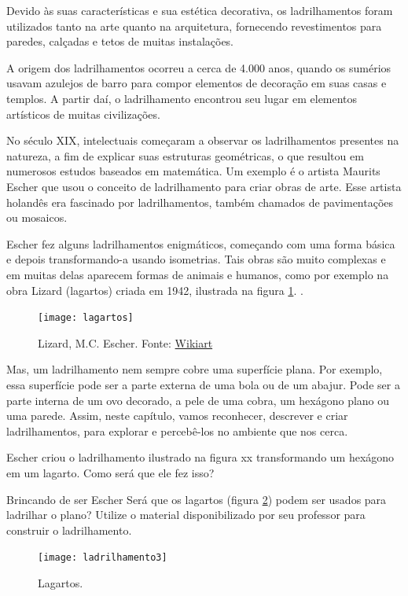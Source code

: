 \clearpage


\label{ladri-exp-1}

Devido às suas características e sua estética decorativa, os ladrilhamentos foram utilizados tanto na arte quanto na arquitetura, fornecendo revestimentos para paredes, calçadas e tetos de muitas instalações. 

A origem dos ladrilhamentos ocorreu a cerca de  4.000 anos, quando os sumérios usavam azulejos de barro para compor elementos de decoração em suas casas e templos. A partir daí, o ladrilhamento encontrou seu lugar em elementos artísticos de muitas civilizações. 

No século XIX, intelectuais começaram a observar os ladrilhamentos presentes na natureza, a fim de explicar suas estruturas geométricas, o que resultou em numerosos estudos baseados em matemática. Um exemplo é  o artista Maurits Escher que usou o conceito de ladrilhamento para criar obras de arte. Esse artista holandês era fascinado por ladrilhamentos, também chamados de pavimentações ou mosaicos. 

Escher fez alguns ladrilhamentos enigmáticos, começando com uma forma básica e depois transformando-a usando isometrias.  Tais obras são muito complexas e em muitas delas aparecem formas de  animais e humanos, como por exemplo na obra  Lizard (lagartos) criada em 1942, ilustrada na figura \ref{lad-fig-1}.
. 

\begin{figure}[H]
\centering
\texttt{[image: lagartos]}

\caption{Lizard, M.C. Escher. Fonte: \href{https://www.wikiart.org/en/m-c-escher/lizard-1}{Wikiart}}
\label{lad-fig-1}
\end{figure}


Mas, um ladrilhamento nem sempre cobre uma superfície plana. Por exemplo, essa  superfície pode ser a parte externa de uma bola ou de um abajur. Pode ser  a parte interna de um ovo decorado, a pele de uma cobra, um hexágono plano ou uma parede. Assim, neste capítulo, vamos reconhecer, descrever e criar ladrilhamentos, para explorar e percebê-los no ambiente que nos cerca.

\begin{reflection}
Escher criou o ladrilhamento ilustrado na figura xx transformando um hexágono em um lagarto. Como será que ele fez isso?
\end{reflection}



\begin{task}{Brincando de ser Escher} \label{at_brinc}
Será que os lagartos (figura \ref{lizard}) podem ser usados para ladrilhar o plano? 
Utilize o material disponibilizado por seu professor para construir o ladrilhamento.


\begin{figure}[H]
\centering
\texttt{[image: ladrilhamento3]}
\label{lizard}
\caption{Lagartos.}
\end{figure}
\end{task}


